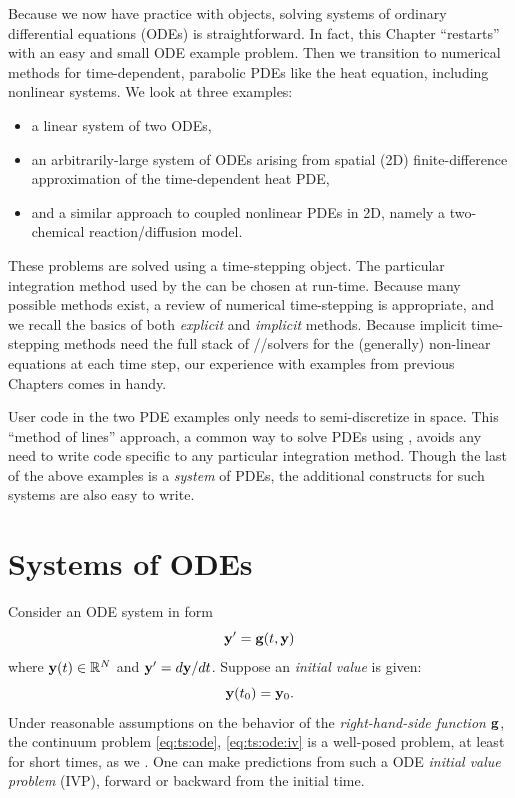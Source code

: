 
Because we now have practice with \PETSc objects, solving systems of ordinary differential equations (ODEs) is straightforward.  In fact, this Chapter ``restarts'' with an easy and small ODE example problem.  Then we transition to numerical methods for time-dependent, parabolic PDEs like the heat equation, including nonlinear systems.  We look at three examples:
\begin{itemize}
\item a linear system of two ODEs,
\item an arbitrarily-large system of ODEs arising from spatial (2D) finite-difference approximation of the time-dependent heat PDE,
\item and a similar approach to coupled nonlinear PDEs in 2D, namely a two-chemical reaction/diffusion model.
\end{itemize}

These problems are solved using a \PETSc \pTS time-stepping object.  The particular integration method used by the \pTS can be chosen at run-time.  Because many possible methods exist, a review of numerical time-stepping is appropriate, and we recall the basics of both \emph{explicit} and \emph{implicit} methods.  Because implicit time-stepping methods need the full stack of \pSNES/\pKSP/\pPC solvers for the (generally) non-linear equations at each time step, our experience with \pSNES examples from previous Chapters comes in handy.

User code in the two PDE examples only needs to semi-discretize in space.  This ``method of lines'' approach, a common way to solve PDEs using \pTS, avoids any need to write code specific to any particular integration method.  Though the last of the above examples is a \emph{system} of PDEs, the additional \PETSc constructs for such systems are also easy to write.


\section{Systems of ODEs}

Consider an ODE system in form
\begin{equation}
\mathbf{y}' = \mathbf{g}(t,\mathbf{y})  \label{eq:ts:ode}
\end{equation}
where $\mathbf{y}(t) \in \mathbb{R}^N$ and $\mathbf{y}'=d\mathbf{y}/dt$.  Suppose an \emph{initial value} is given:
\begin{equation}
\mathbf{y}(t_0) = \mathbf{y}_0.  \label{eq:ts:ode:iv}
\end{equation}
Under reasonable assumptions on the behavior of the \emph{right-hand-side function} $\mathbf{g}$, the continuum problem \eqref{eq:ts:ode}, \eqref{eq:ts:ode:iv} is a well-posed problem, at least for short times, as we .  One can make predictions from such a ODE \emph{initial value problem} (IVP), forward or backward from the initial time.

